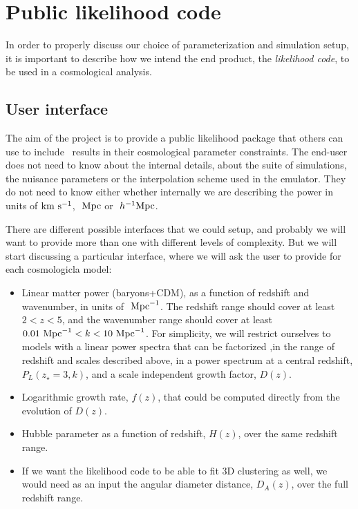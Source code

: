 \section{Public likelihood code} \label{sec:like}

In order to properly discuss our choice of parameterization and simulation
setup, it is important to describe how we intend the end product,
the \textit{likelihood code}, to be used in a cosmological analysis.


\subsection{User interface}

The aim of the project is to provide a public likelihood package that others
can use to include \lya\ results in their cosmological parameter constraints.
The end-user does not need to know about the internal details, about the 
suite of simulations, the nuisance parameters or the interpolation scheme 
used in the emulator.
They do not need to know either whether internally we are describing the 
power in units of ${\rm km~s^{-1}}$, $\ \text{Mpc}$ or $\ h^{-1}\text{Mpc}$. 

There are different possible interfaces that we could setup, and probably 
we will want to provide more than one with different levels of complexity.
But we will start discussing a particular interface, where we will ask 
the user to provide for each cosmologicla model:
\begin{itemize}
 \item Linear matter power (baryons+CDM), as a function of redshift and 
  wavenumber, in units of $\ \text{Mpc}^{-1}$. 
  The redshift range should cover at least $2 < z < 5$, and the wavenumber
  range should cover at least $0.01 \ \text{Mpc}^{-1} < k < 10 \ \text{Mpc}^{-1}$. 
  For simplicity, we will restrict ourselves to models with a linear power 
  spectra that can be factorized ,in the range of redshift and scales 
  described above, in a power spectrum at a central redshift, 
  $P_L(z_\star=3,k)$, and a scale independent growth factor, $D(z)$.
 \item Logarithmic growth rate, $f(z)$, that could be computed directly
  from the evolution of $D(z)$.
 \item Hubble parameter as a function of redshift, $H(z)$, over the same 
  redshift range.
 \item If we want the likelihood code to be able to fit 3D clustering as well,
  we would need as an input the angular diameter distance, $D_A(z)$, 
  over the full redshift range.
\end{itemize}

